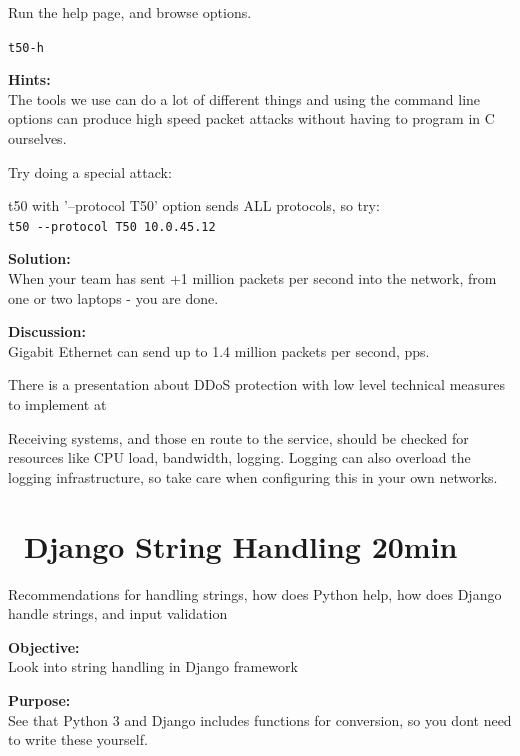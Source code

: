 \documentclass[a4paper,11pt,notitlepage]{report}
\begin{document}
Run the help page, and browse options.
\begin{alltt}\footnotesize
t50 -h
\end{alltt}





{\bf Hints:}\\
The tools we use can do a lot of different things and using the command line options can produce high speed packet attacks without having to program in C ourselves.

Try doing a special attack:
\begin{list2}
\item t50 with '--protocol T50' option sends ALL protocols, so try:\\
\verb+t50 --protocol T50 10.0.45.12+
\end{list2}


{\bf Solution:}\\
When your team has sent +1 million packets per second into the network, from one or two laptops - you are done.

{\bf Discussion:}\\
Gigabit Ethernet can send up to 1.4 million packets per second, pps.

There is a presentation about DDoS protection with low level technical measures to implement at\\
{\footnotesize {}}

Receiving systems, and those en route to the service, should be checked for resources like CPU load, bandwidth, logging. Logging can also overload the logging infrastructure, so take care when configuring this in your own networks.




\chapter{\faExclamationTriangle\ Django String Handling 20min}
\label{ex:django-string}

Recommendations for handling strings, how does Python help, how does Django handle strings, and input validation

{\bf Objective:}\\
Look into string handling in Django framework

{\bf Purpose:}\\
See that Python 3 and Django includes functions for conversion, so you dont need to write these yourself.
\end{document}
